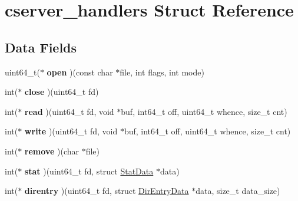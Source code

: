 \hypertarget{structcserver__handlers}{}\section{cserver\+\_\+handlers Struct Reference}
\label{structcserver__handlers}
\subsection*{Data Fields}
\begin{DoxyCompactItemize}
\item 
uint64\+\_\+t($\ast$ {\bfseries open} )(const char $\ast$file, int flags, int mode)\hypertarget{structcserver__handlers_ae60764b0d7235cedb4253950fd42f1e2}{}\label{structcserver__handlers_ae60764b0d7235cedb4253950fd42f1e2}

\item 
int($\ast$ {\bfseries close} )(uint64\+\_\+t fd)\hypertarget{structcserver__handlers_ab62b7e7209b0dbea86d622809fd40be8}{}\label{structcserver__handlers_ab62b7e7209b0dbea86d622809fd40be8}

\item 
int($\ast$ {\bfseries read} )(uint64\+\_\+t fd, void $\ast$buf, int64\+\_\+t off, uint64\+\_\+t whence, size\+\_\+t cnt)\hypertarget{structcserver__handlers_ad9e287dbb913fdb07bb71e08db51d3c6}{}\label{structcserver__handlers_ad9e287dbb913fdb07bb71e08db51d3c6}

\item 
int($\ast$ {\bfseries write} )(uint64\+\_\+t fd, void $\ast$buf, int64\+\_\+t off, uint64\+\_\+t whence, size\+\_\+t cnt)\hypertarget{structcserver__handlers_a14fc58c7d61c56067c919a08b82c3f43}{}\label{structcserver__handlers_a14fc58c7d61c56067c919a08b82c3f43}

\item 
int($\ast$ {\bfseries remove} )(char $\ast$file)\hypertarget{structcserver__handlers_a7074173e3806bd3793b24878785225ab}{}\label{structcserver__handlers_a7074173e3806bd3793b24878785225ab}

\item 
int($\ast$ {\bfseries stat} )(uint64\+\_\+t fd, struct \hyperlink{structStatData}{Stat\+Data} $\ast$data)\hypertarget{structcserver__handlers_a5e0c55c16df2ed6a9ddd5a516bfe1165}{}\label{structcserver__handlers_a5e0c55c16df2ed6a9ddd5a516bfe1165}

\item 
int($\ast$ {\bfseries direntry} )(uint64\+\_\+t fd, struct \hyperlink{structDirEntryData}{Dir\+Entry\+Data} $\ast$data, size\+\_\+t data\+\_\+size)\hypertarget{structcserver__handlers_a025104e60dc8b17fd9723883a91dbc0d}{}\label{structcserver__handlers_a025104e60dc8b17fd9723883a91dbc0d}


\end{DoxyCompactItemize}
